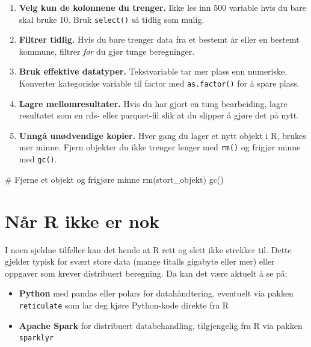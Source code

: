 \documentclass[
  norsk,
  letterpaper,
  DIV=11,
  numbers=noendperiod]{scrreprt}
\newenvironment{Shaded}{\begin{snugshade}}{\end{snugshade}}
\newcommand{\CommentTok}[1]{\textcolor[rgb]{0.37,0.37,0.37}{#1}}
\newcommand{\FunctionTok}[1]{\textcolor[rgb]{0.28,0.35,0.67}{#1}}
\newcommand{\NormalTok}[1]{\textcolor[rgb]{0.00,0.23,0.31}{#1}}
\providecommand{\tightlist}{%
  \setlength{\itemsep}{0pt}\setlength{\parskip}{0pt}}
\theoremstyle{definition}
\theoremstyle{remark}
\begin{document}
\begin{enumerate}
\def\labelenumi{\arabic{enumi}.}
\item
  \textbf{Velg kun de kolonnene du trenger.} Ikke les inn 500 variable
  hvis du bare skal bruke 10. Bruk \texttt{select()} så tidlig som
  mulig.
\item
  \textbf{Filtrer tidlig.} Hvis du bare trenger data fra et bestemt år
  eller en bestemt kommune, filtrer \emph{før} du gjør tunge
  beregninger.
\item
  \textbf{Bruk effektive datatyper.} Tekstvariable tar mer plass enn
  numeriske. Konverter kategoriske variable til factor med
  \texttt{as.factor()} for å spare plass.
\item
  \textbf{Lagre mellomresultater.} Hvis du har gjort en tung
  bearbeiding, lagre resultatet som en rds- eller parquet-fil slik at du
  slipper å gjøre det på nytt.
\item
  \textbf{Unngå unødvendige kopier.} Hver gang du lager et nytt objekt i
  R, brukes mer minne. Fjern objekter du ikke trenger lenger med
  \texttt{rm()} og frigjør minne med \texttt{gc()}.
\end{enumerate}

\begin{Shaded}
\begin{Highlighting}[]
\CommentTok{\# Fjerne et objekt og frigjøre minne}
\FunctionTok{rm}\NormalTok{(stort\_objekt)}
\FunctionTok{gc}\NormalTok{()}
\end{Highlighting}
\end{Shaded}

\section{Når R ikke er nok}\label{nuxe5r-r-ikke-er-nok}

I noen sjeldne tilfeller kan det hende at R rett og slett ikke strekker
til. Dette gjelder typisk for svært store data (mange titalls gigabyte
eller mer) eller oppgaver som krever distribuert beregning. Da kan det
være aktuelt å se på:

\begin{itemize}
\tightlist
\item
  \textbf{Python} med pandas eller polars for datahåndtering, eventuelt
  via pakken \texttt{reticulate} som lar deg kjøre Python-kode direkte
  fra R
\item
  \textbf{Apache Spark} for distribuert databehandling, tilgjengelig fra
  R via pakken \texttt{sparklyr}
\end{itemize}
\end{document}
